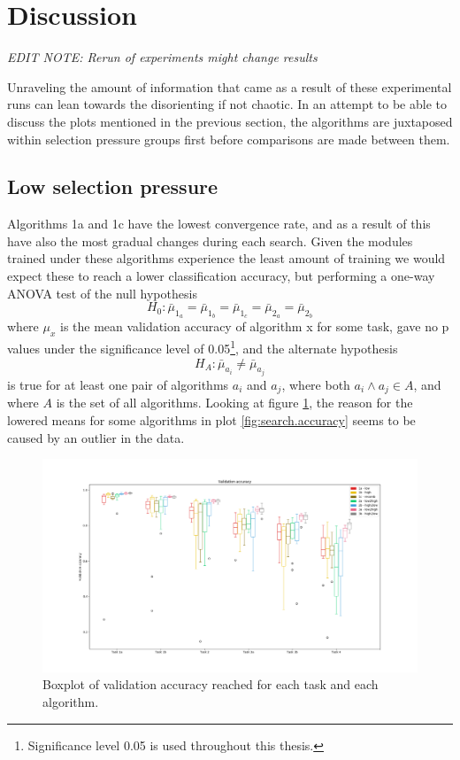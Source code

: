 \section{Discussion}
\textit{EDIT NOTE: Rerun of experiments might change results}

Unraveling the amount of information that came as a result of these experimental runs can lean towards the disorienting if not chaotic. In an attempt to be able to discuss the plots mentioned in the previous section, the algorithms are juxtaposed within selection pressure groups first before comparisons are made between them. 

\subsection{Low selection pressure}
Algorithms 1a and 1c have the lowest convergence rate, and as a result of this have also the most gradual changes during each search. Given the modules trained under these algorithms experience the least amount of training we would expect these to reach a lower classification accuracy, but performing a one-way ANOVA test of the null hypothesis
\begin{equation*}
    \label{eq:H0.accuracy.notLowPressure}
    H_{0}:\bar{\mu}_{1_{a}}=\bar{\mu}_{1_{b}}=\bar{\mu}_{1_{c}}=\bar{\mu}_{2_{a}}=\bar{\mu}_{2_{b}}
\end{equation*}
where \(\mu_{x}\) is the mean validation accuracy of algorithm x for some task, gave no p values under the significance level of 0.05\footnote{Significance level 0.05 is used throughout this thesis.}, and the alternate hypothesis
\begin{equation*}
    \label{eq:H0.accuracy.notLowPressure}
    H_{A}:\bar{\mu}_{a_{i}} \neq \bar{\mu}_{a_{j}} 
\end{equation*}
is true for at least one pair of algorithms \(a_{i}\) and \(a_{j}\), where both \(a_{i} \land a_{j} \in A\), and where \(A\) is the set of all algorithms. Looking at figure \ref{fig:search.validation}, the reason for the lowered means for some algorithms in plot \ref{fig:search.accuracy} seems to be caused by an outlier in the data.

\begin{figure}[p!]%
    \includegraphics[width=1.2\textwidth, center]{Chapters/Experiments/search_algo/figures/validation_boxplot.png}
    \caption{Boxplot of validation accuracy reached for each task and each algorithm.}
    \label{fig:search.validation}
\end{figure}

